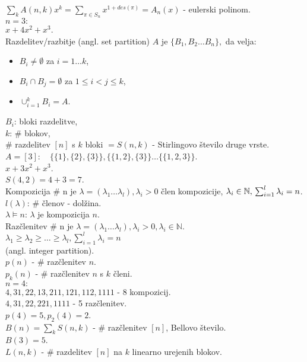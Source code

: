 \documentclass[a4paper, 12pt]{book}
\theoremstyle{definition}
\theoremstyle{remark}
\newcommand{\N}{\mathbb{N}}
\begin{document}
$\sum_k A(n,k) x^k = \sum_{\pi \in S_n} x^{1+des(\pi)} = A_n(x)$ - eulerski polinom. \\
$n=3:$ \\
$x + 4x^2 + x^3$. \\
Razdelitev/razbitje (angl. set partition) $A$ je $\{B_1, B_2 \dots B_n\},$ da velja:
\begin{itemize}[label={--}]
  \item $B_i \neq \emptyset$ za $i = 1 \dots k$,
  \item $B_i \cap B_j = \emptyset$ za $1 \leq i < j \leq k$,
  \item $\cup_{i=1}^k B_i = A$.
\end{itemize}
$B_i$: bloki razdelitve, \\
$k$: \# blokov, \\
\# razdelitev $[n]$ s $k$ bloki $= S(n,k)$ - Stirlingovo število druge vrste. \\
$A = [3]: \quad \{\{1\}, \{2\}, \{3\}\}, \{\{1,2\}, \{3\}\} \dots \{\{1,2,3\}\}$. \\
$x + 3 x^2 + x^3$. \\
$S(4,2) = 4 + 3 = 7$. \\
Kompozicija \# n je $\lambda = (\lambda_1 \dots \lambda_l), \lambda_i > 0$ člen kompozicije,
$\lambda_i \in \N, \\
\sum_{i=1}^{l} \lambda_i = n$. \\
$l(\lambda)$: \# členov - dolžina. \\
$\lambda \models n$: $\lambda$ je kompozicija $n$. \\
Razčlenitev \# n je $\lambda = (\lambda_1 \dots \lambda_l), \lambda_i > 0, \lambda_i \in \N$. \\
$\lambda_1 \geq \lambda_2 \geq \dots \geq \lambda_l, \sum_{i=1}^{l} \lambda_i = n$ \\
(angl. integer partition). \\
$p(n)$ - \# razčlenitev $n$. \\
$p_k(n)$ - \# razčlenitev $n$ s $k$ členi. \\
$n=4:$ \\
$4, 31, 22, 13, 211, 121, 112, 1111$ - 8 kompozicij. \\
$4, 31, 22, 221, 1111$ - 5 razčlenitev. \\
$p(4) = 5, p_2(4) = 2$. \\
$B(n) = \sum_k S(n,k)$ - \# razčlenitev $[n]$, Bellovo število. \\
$B(3) = 5$. \\
$L(n,k)$ - \# razdelitev $[n]$ na $k$ linearno urejenih blokov. \\
\end{document}
